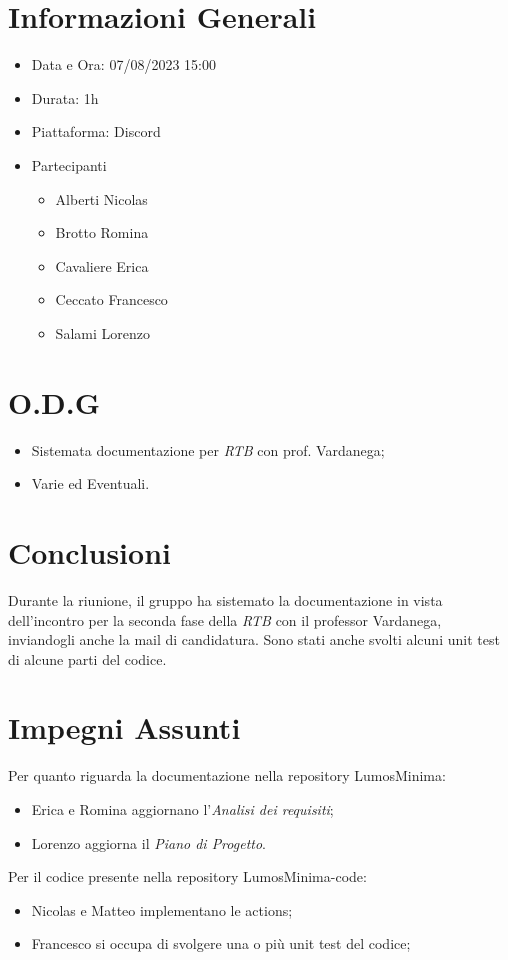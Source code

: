 \documentclass[a4paper, 12pt]{article}
\begin{document}
\makefrontpage

\section*{Informazioni Generali}
\begin{itemize}
    \item Data e Ora: 07/08/2023 15:00
    \item Durata: 1h
    \item Piattaforma: Discord
    \item Partecipanti
    \begin{itemize}
        \item Alberti Nicolas
        \item Brotto Romina
        \item Cavaliere Erica
        \item Ceccato Francesco
        \item Salami Lorenzo
    \end{itemize}
\end{itemize}

\section*{O.D.G}
\begin{itemize}
    \item Sistemata documentazione per \textit{RTB} con prof. Vardanega;
    \item Varie ed Eventuali.
\end{itemize}

\section*{Conclusioni}
Durante la riunione, il gruppo ha sistemato la documentazione in vista dell'incontro per la seconda fase della \textit{RTB} con il professor Vardanega, inviandogli anche la mail di candidatura.\newline
Sono stati anche svolti alcuni unit test di alcune parti del codice.

\section*{Impegni Assunti}

Per quanto riguarda la documentazione nella repository LumosMinima:
\begin{itemize}
    \item Erica e Romina aggiornano l'\textit{Analisi dei requisiti};
    \item Lorenzo aggiorna il \textit{Piano di Progetto}.
\end{itemize}

Per il codice presente nella repository LumosMinima-code:
\begin{itemize}
    \item Nicolas e Matteo implementano le actions;
    \item Francesco si occupa di svolgere una o più unit test del codice;
\end{itemize}
\end{document}
